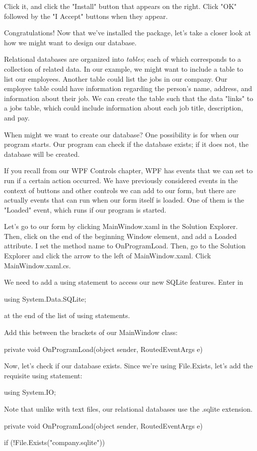 \documentclass[oneside, openany] {book}
\begin{document}
Click it, and click the "Install" button that appears on the right. Click "OK" followed by the "I Accept" buttons when they appear.

Congratulations! Now that we've installed the package, let's take a closer look at how we might want to design our database.

Relational databases are organized into \emph{tables}; each of which corresponds to a collection of related data. In our example, we might want to include a table to list our employees. Another table could list the jobs in our company. Our employee table could have information regarding the person's name, address, and information about their job. We can create the table such that the data "links" to a jobs table, which could include information about each job title, description, and pay.

When might we want to create our database? One possibility is for when our program starts. Our program can check if the database exists; if it does not, the database will be created.

If you recall from our WPF Controls chapter, WPF has events that we can set to run if a certain action occurred. We have previously considered events in the context of buttons and other controls we can add to our form, but there are actually events that can run when our form itself is loaded. One of them is the "Loaded" event, which runs if our program is started.

Let's go to our form by clicking MainWindow.xaml in the Solution Explorer. Then, click on the end of the beginning Window element, and add a Loaded attribute. I set the method name to OnProgramLoad. Then, go to the Solution Explorer and click the arrow to the left of MainWindow.xaml. Click MainWindow.xaml.cs.

We need to add a using statement to access our new SQLite features. Enter in 
\begin{CSharp}
using System.Data.SQLite;
\end{CSharp}
at the end of the list of using statements.


Add this between the brackets of our MainWindow class:
\begin{CSharp}
private void OnProgramLoad(object sender, RoutedEventArgs e)
        {

        }
\end{CSharp}
Now, let's check if our database exists. Since we're using File.Exists, let's add the requisite using statement:
\begin{CSharp}
using System.IO;
\end{CSharp}
Note that unlike with text files, our relational databases use the .sqlite extension.
\begin{CSharp}
private void OnProgramLoad(object sender, RoutedEventArgs e)
        {
            if (!File.Exists("company.sqlite"))
            {
                
            }
        }
\end{CSharp}
\end{document}
